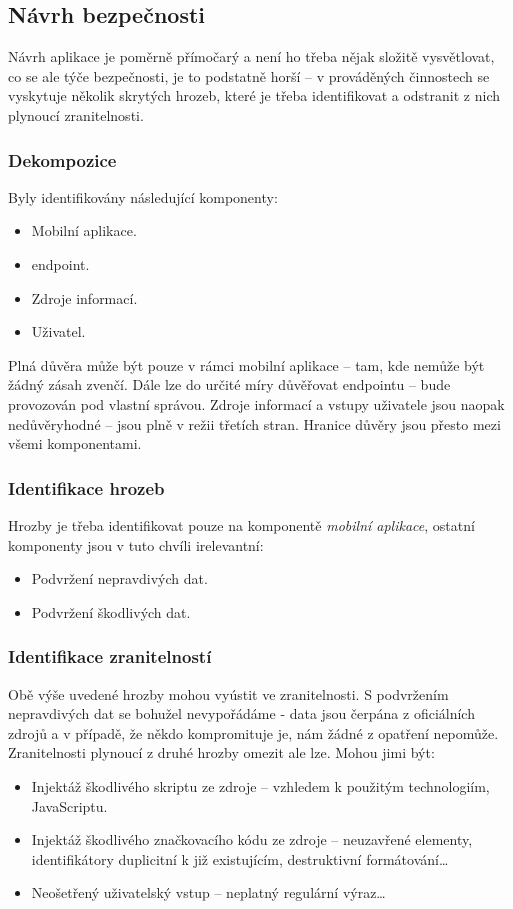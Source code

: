 \subsection{Návrh bezpečnosti}
Návrh aplikace je poměrně přímočarý a není ho třeba nějak složitě vysvětlovat, co se ale týče bezpečnosti, je to podstatně horší -- v prováděných činnostech se vyskytuje několik skrytých hrozeb, které je třeba identifikovat a odstranit z nich plynoucí zranitelnosti.

\subsubsection{Dekompozice}
Byly identifikovány následující komponenty:
\begin{itemize}
 \item Mobilní aplikace.
 \item {} endpoint.
 \item Zdroje informací.
 \item Uživatel.
\end{itemize}
Plná důvěra může být pouze v rámci mobilní aplikace -- tam, kde nemůže být žádný zásah zvenčí. Dále lze do určité míry důvěřovat  endpointu -- bude provozován pod vlastní správou. Zdroje informací a vstupy uživatele jsou naopak nedůvěryhodné -- jsou plně v režii třetích stran. Hranice důvěry jsou přesto mezi všemi komponentami.

\subsubsection{Identifikace hrozeb}
Hrozby je třeba identifikovat pouze na komponentě \emph{mobilní aplikace}, ostatní komponenty jsou v tuto chvíli irelevantní:
\begin{itemize}
 \item Podvržení nepravdivých dat.
 \item Podvržení škodlivých dat.
\end{itemize}

\subsubsection{Identifikace zranitelností}
Obě výše uvedené hrozby mohou vyústit ve zranitelnosti. S podvržením nepravdivých dat se bohužel nevypořádáme - data jsou čerpána z oficiálních zdrojů a v případě, že někdo kompromituje je, nám žádné z opatření nepomůže. Zranitelnosti plynoucí z druhé hrozby omezit ale lze. Mohou jimi být:
\begin{itemize}
 \item Injektáž škodlivého skriptu ze zdroje -- vzhledem k použitým technologiím, JavaScriptu.
 \item Injektáž škodlivého značkovacího kódu ze zdroje -- neuzavřené  elementy, identifikátory duplicitní k již existujícím, destruktivní formátování\dots
 \item Neošetřený uživatelský vstup -- neplatný regulární výraz\dots
\end{itemize}


